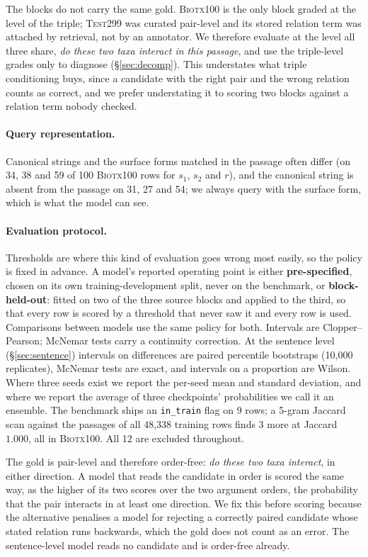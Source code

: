 \documentclass[11pt]{article}
\begin{document}
The blocks do not carry the same gold. \textsc{Biotx100} is the only block graded at the level of
the triple; \textsc{Test299} was curated pair-level and its stored relation term was attached
by retrieval, not by an annotator. We therefore evaluate at the level all three
share, \emph{do these two taxa interact in this passage}, and use the triple-level grades only to
diagnose (\S\ref{sec:decomp}). This understates what triple conditioning buys, since a candidate
with the right pair and the wrong relation counts as correct, and we prefer understating it to
scoring two blocks against a relation term nobody checked.

\paragraph{Query representation.}
Canonical strings and the surface forms matched in the passage often differ (on 34, 38 and 59 of
100 \textsc{Biotx100} rows for $s_1$, $s_2$ and $r$), and the canonical string is absent from the
passage on 31, 27 and 54; we always query with the surface form, which
is what the model can see.

\paragraph{Evaluation protocol.}
Thresholds are where this kind of evaluation goes wrong most easily, so the policy is fixed in
advance. A model's reported operating point is either \textbf{pre-specified}, chosen on its own
training-development split, never on the benchmark, or \textbf{block-held-out}: fitted on two of
the three source blocks and applied to the third, so that every row is scored by a threshold that
never saw it and every row is used. Comparisons between models use the same policy for both.
Intervals are Clopper--Pearson; McNemar tests
\citep{mcnemar1947note} carry a continuity correction. At the sentence level (\S\ref{sec:sentence})
intervals on differences are paired percentile bootstraps (10{,}000 replicates), McNemar tests are
exact, and intervals on a proportion are Wilson. Where three seeds exist we report the per-seed mean and standard deviation, and where we
report the average of three checkpoints' probabilities we call it an ensemble. The benchmark ships
an \texttt{in\_train} flag on 9 rows; a 5-gram Jaccard scan against the passages of all 48{,}338 training rows
finds 3 more at Jaccard $1.000$, all in \textsc{Biotx100}. All 12 are excluded throughout.

The gold is pair-level and therefore order-free: \emph{do these two taxa interact}, in either
direction. A model that reads the candidate in order is scored the same way, as the higher of its
two scores over the two argument orders, the probability that the pair interacts in at least one
direction. We fix this before scoring because the alternative penalises a model for rejecting a
correctly paired candidate whose stated relation runs backwards, which the gold does not count as an
error. The sentence-level model reads no candidate and is order-free already.
\end{document}
